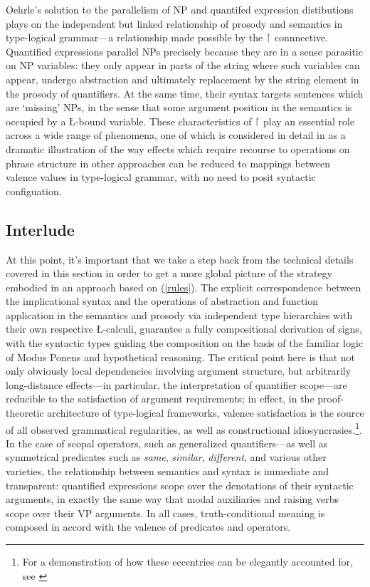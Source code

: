 \documentclass[output=paper,colorlinks,citecolor=brown]{langscibook}
\begin{document}
Oehrle's solution to the parallelism of NP and quantifed expression
distibutions plays on the independent but linked relationship of
prosody and semantics in type-logical grammar—a relationship made
possible by the \ensuremath{\vs} connnective. Quantified expressions parallel NPs
precisely because they are in a sense parasitic on NP variables: they
only appear in parts of the string where such variables can appear,
undergo abstraction and ultimately replacement by the string element
in the prosody of quantifiers. At the same time, their syntax targets
sentences which are `missing' NPs, in the sense that some argument
position in the semantics is occupied by a \L-bound variable. These
characteristics of \ensuremath{\vs} play an essential role across a wide range of
phenomena, one of which is considered in detail in  as
a dramatic illustration of the way effects which require recourse to
operations on phrase structure in other approaches can be reduced to
mappings between valence values in type-logical grammar, with no need
to posit syntactic configuation.


\subsection{Interlude}

At this point, it's important that we take a step back from the
technical details covered in this section in order to get a more
global picture of the strategy embodied in an approach based on
(\ref{rules}). The explicit correspondence between the implicational syntax
and the operations of abstraction and function application in the
semantics and prosody via independent type hierarchies with their own
respective \L-calculi, guarantee a fully compositional derivation of
signs, with the syntactic types guiding the composition on the basis
of the familiar logic of Modus Ponens and hypothetical reasoning. The
critical point here is that not only obviously local dependencies
involving argument structure, but arbitrarily long-distance
effects---in particular, the interpretation of quantifier scope---are
reducible to the satisfaction of argument requirements; in effect, in
the proof-theoretic architecture of type-logical frameworks, valence
satisfaction is the source of all observed grammatical regularities,
as well as constructional idiosyncrasies.\footnote{For
a demonstration of how these eccentries can be elegantly accounted
for, see \citet{kubota-levine2022a}}. In the case of scopal operators, such
as generalized quantifiers---as well as symmetrical predicates such as
\textit{same}, \textit{similar}, \textit{different}, and various other varieties, the
relationship between semantics and syntax is immediate and
transparent: quantified expressions scope over the denotations of
their syntactic arguments, in exactly the same way that modal
auxiliaries and raising verbs scope over their VP arguments. In all
cases, truth-conditional meaning is composed in accord with the
valence of predicates and operators.
\end{document}
